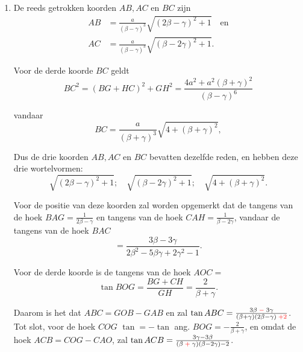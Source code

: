 \documentclass[10pt,a4paper]{article}
\newcommand{\switchenum}{\setcounter{enumi}{\arabic{enumi}-1}\switchcolumn}
\begin{document}
\begin{paracol}{2}
\begin{enumerate}[topsep=1px]
		\switchenum
		\item De reeds getrokken koorden $AB, AC$ en $BC$ zijn
		\begin{align*}
			AB &= \frac{a}{(\beta-\gamma)^3}\sqrt{(2\beta-\gamma)^2 +1} \quad \text{en}\\
			AC & = \frac{a}{(\beta-\gamma)^3}\sqrt{(\beta - 2\gamma)^2+1}.
		\end{align*}
		\par Voor de derde koorde $BC$ geldt
		\[
			BC^2 = (BG + HC)^2 + GH^2 = \frac{4a^2+a^2(\beta+ \gamma)^2}{(\beta - \gamma )^6}
		\]
		\par vandaar
		\[
			BC = \frac{a}{(\beta+\gamma)^3} \sqrt{4+(\beta+\gamma)^2},
		\]
		\par Dus de drie koorden $AB, AC$ en $BC$ bevatten dezelfde reden, en hebben deze drie wortelvormen:
		\[
			\sqrt{(2\beta-\gamma)^2+1}; \quad \sqrt{(\beta-2\gamma)^2+1}; \quad \sqrt{4+(\beta+\gamma)^2}.
		\]
		\par Voor de positie van deze koorden zal worden opgemerkt dat de tangens van de hoek $BAG = \frac{1}{2\beta- \gamma}$ en tangens van de hoek $CAH = \frac{1}{\beta - 2\gamma}$, vandaar de tangens van de hoek $BAC$
		\[
			= \frac{3\beta - 3\gamma}{2\beta^2 - 5\beta \gamma + 2\gamma^2 -1}.
		\]
		\par Voor de derde koorde is de tangens van de hoek $AOC=$
		\[
			\tan BOG = \frac{BG + CH}{GH} = \frac{2}{\beta + \gamma}.
		\]
		\par Daarom is het dat $ABC = GOB - GAB$ en zal $\tan ABC = \frac{3\beta \;{\color{red}-}\; 3\gamma}{(\beta+\gamma)(2\beta - \gamma)\;{\color{red}+2}}$. Tot slot, voor de hoek $COG$ $\tan = -\tan$ ang. $BOG = -\frac{2}{\beta+\gamma}$, en omdat de hoek  $ACB = COG-CAO$, zal $\tan ACB = \frac{3\gamma-3\beta}{(\beta \;{\color{red}+}\; \gamma)(\beta - 2\gamma)-2}$.
		
		\switchcolumn*
		

\end{enumerate}
\end{paracol}
\end{document}
